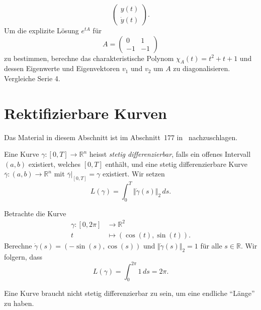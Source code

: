 \documentclass[../main.tex]{subfiles}
\begin{document}
\begin{examples}
\begin{enumerate}[(1)]
\[        \begin{pmatrix}
          y(t) \\
          \dot y(t)
        \end{pmatrix}.
      \]
      Um die explizite Lösung $e^{tA}$ für
      \[
        A =
        \begin{pmatrix}
          0 & 1 \\
          -1 & -1
        \end{pmatrix}
      \]
      zu bestimmen,
      berechne das charakteristische
      Polynom $\chi_{A}(t) = t^2 + t + 1$
      und dessen Eigenwerte und Eigenvektoren
      $v_1$ und $v_2$
      um $A$ zu diagonalisieren.
      Vergleiche Serie 4.
  \end{enumerate}
\end{examples}

\section{Rektifizierbare Kurven}
Das Material in diesem Abschnitt ist im
Abschnitt~177 in~\cite{heuser} nachzuschlagen.
\begin{definition}
  Eine Kurve $\gamma \colon [0, T] \to \mathbb{R}^n$ heisst
  \emph{stetig differenzierbar}, falls ein offenes Intervall
  $(a, b)$ existiert, welches $[0, T]$ enthält,
  und eine stetig differenzierbare
  Kurve $\overline \gamma \colon (a, b)
  \to \mathbb{R}^n$
  mit $\overline \gamma |_{[0, T]} = \gamma$
  existiert.
  Wir setzen
  \[
    L(\gamma) = \int_{0}^{T} \Vert \dot \gamma
    (s) \Vert_2 \, ds.
  \]
\end{definition}

\begin{example}
  Betrachte die Kurve
  \begin{align*}
    \gamma \colon [0, 2\pi] & \to \mathbb{R}^2 \\
    t & \mapsto (\cos(t), \sin(t)).
  \end{align*}
  Berechne
  \(
  \dot \gamma(s) = (- \sin(s), \cos(s))
  \)
  und $\Vert \dot \gamma(s) \Vert_2 = 1$
  für alle $s \in \mathbb{R}$.
  Wir folgern, dass
  \[
    L(\gamma) = \int_{0}^{2\pi} 1 \, ds
    = 2\pi.
  \]
\end{example}

Eine Kurve braucht nicht stetig differenzierbar
zu sein, um eine endliche ``Länge'' zu haben.
\end{document}

